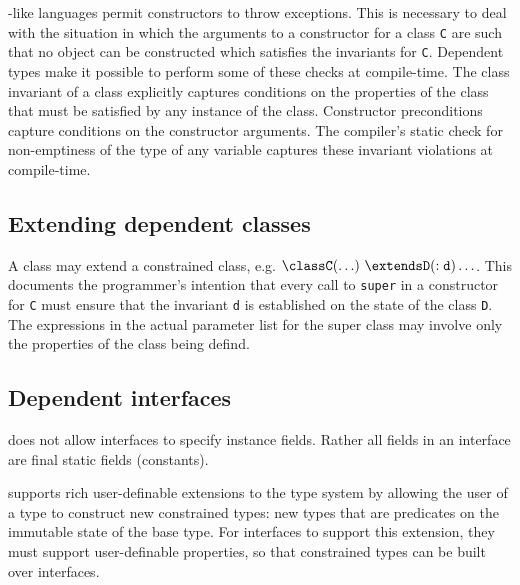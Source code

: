 \java{}-like languages permit constructors to throw exceptions. This
is necessary to deal with the situation in which the arguments to a
constructor for a class {\tt C} are such that no object can be
constructed which satisfies the invariants for {\tt C}. Dependent
types make it possible to perform some of these checks at
compile-time. The class invariant of a class explicitly captures
conditions on the properties of the class that must be satisfied by
any instance of the class.  Constructor preconditions capture
conditions on the constructor arguments.
The compiler's static check for
non-emptiness of the type of any variable captures these invariant
violations at compile-time.




\subsection{Extending dependent classes}

A class may extend a constrained class, e.g. ${\tt \class C(\ldots)\
\extends D(:d)\ldots}$. This documents the programmer's intention that
every call to {\tt super} in a constructor for {\tt C} must ensure
that the invariant {\tt d} is established on the state of the class
{\tt D}. The expressions in the actual parameter list for the super
class may involve only the properties of the class being defind.


\subsection{Dependent interfaces}

\java{} does not allow interfaces to specify instance fields. Rather all
fields in an interface are final static fields (constants).

\Xten{} supports rich user-definable extensions to the type system by
allowing the user of a type to construct new constrained types: new
types that are predicates on the immutable state of the base type.
For interfaces to support this extension, they must support
user-definable properties, so that constrained types can be
built over interfaces.

